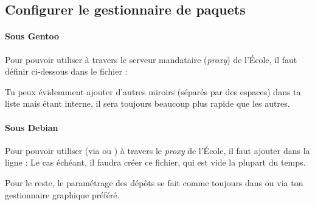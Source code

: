 \subsection{Configurer le gestionnaire de paquets}

\paragraph{Sous Gentoo}
\label{gentoo_mirror} Pour pouvoir utiliser  à  travers le serveur mandataire (\emph{proxy}) de l'École, il faut définir %
ci-dessous dans le fichier  :

Tu peux évidemment ajouter d'autres miroirs (séparés par des espaces) dans ta liste mais  étant interne, il sera toujours beaucoup plus rapide que les autres.



\paragraph{Sous Debian}
\label{debian_mirror} Pour pouvoir utiliser  (via  ou ) à travers le \emph{proxy} de l'École, il faut ajouter dans  la ligne :
Le cas échéant, il faudra créer ce fichier, qui est vide la plupart du temps.

Pour le reste, le paramétrage des dépôts se fait comme toujours dans  ou via ton gestionnaire graphique préféré.
